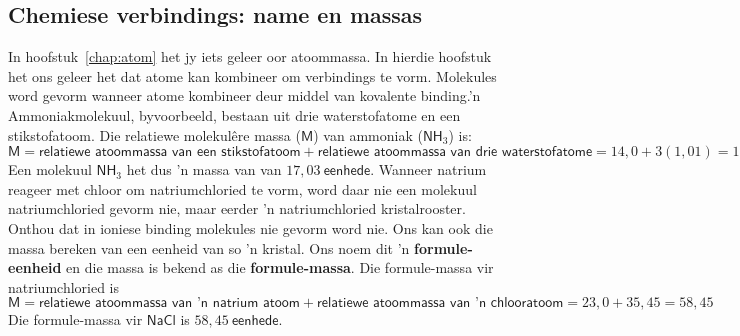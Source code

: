             \subsection*{Chemiese verbindings: name en massas}
            \nopagebreak
\label{m38689*uid97124}In hoofstuk~\ref{chap:atom} het jy iets geleer oor atoommassa. In hierdie hoofstuk het ons geleer het dat atome kan kombineer om verbindings te vorm. Molekules word gevorm wanneer atome kombineer deur middel van kovalente binding.’n Ammoniakmolekuul, byvoorbeeld, bestaan ​​uit drie waterstofatome en een stikstofatoom. Die relatiewe molekul\^{e}re massa ($\textsf{M}$) van ammoniak ($\textsf{NH}_{3}$) is:\\
\begin{equation*}
 \textsf{M} = \textsf{relatiewe atoommassa van een stikstofatoom} + \textsf{relatiewe atoommassa van drie waterstofatome}
= 14,0 + 3(1,01) 
= 17,03
\end{equation*}
Een molekuul $\textsf{NH}_{3}$ het dus   'n massa van van $17,03~\textsf{eenhede}$. Wanneer natrium reageer met chloor om natriumchloried te vorm, word daar nie een molekuul natriumchloried gevorm nie, maar eerder 'n natriumchloried kristalrooster. Onthou dat in ioniese binding molekules nie gevorm word nie. Ons kan ook die massa bereken van een eenheid van so 'n kristal. Ons noem dit  'n \textbf{formule-eenheid} en die massa is bekend as die \textbf{formule-massa}. Die formule-massa vir natriumchloried is
 \begin{equation*}
 \textsf{M} = \textsf{relatiewe atoommassa van  'n natrium atoom} + \textsf{relatiewe atoommassa van 'n chlooratoom}
= 23,0 + 35,45 
= 58,45
\end{equation*} 
Die formule-massa vir $\textsf{NaCl}$ is $58,45~\textsf{eenhede}$.
      \label{m38689*secfhsst!!!underscore!!!id822}

